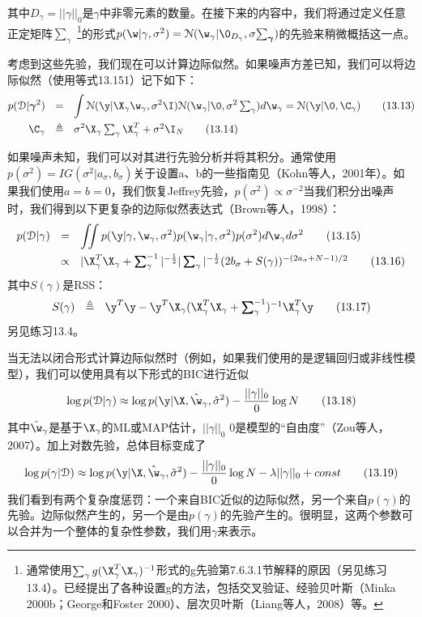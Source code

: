 \documentclass[a4paper]{article}
\begin{document}
其中$D_\gamma=||\gamma||_0$是$\gamma$中非零元素的数量。在接下来的内容中，我们将通过定义任意正定矩阵$\textstyle{\sum\nolimits_{\gamma}}$ \footnote{通常使用$\sum\nolimits_{\gamma} g (\X_{\gamma}^T \X_{\gamma})^{-1}$形式的g先验第7.6.3.1节解释的原因（另见练习13.4）。已经提出了各种设置g的方法，包括交叉验证、经验贝叶斯（Minka 2000b；George和Foster 2000）、层次贝叶斯（Liang等人，2008）等。 }的形式$p(\w|\gamma,\sigma^2)=\mathcal{N}(\w_\gamma |\0_{D_\gamma},\sigma\boldsymbol{\textstyle{\sum\nolimits_{\gamma}}})$的先验来稍微概括这一点。

考虑到这些先验，我们现在可以计算边际似然。如果噪声方差已知，我们可以将边际似然（使用等式13.151）记下如下： 
\begin{align}
p(\mathcal{D}|\boldsymbol{\gamma}^2)\ \ &=\ \ \int \mathcal{N}(\y | \X_{\gamma} \w_{\gamma},\sigma^2\I)\mathcal{N}(\w_\gamma|\0,\sigma^2\textstyle\sum\nolimits_{\gamma})d\w_\gamma =\mathcal{N}(\y|\0,\C_\gamma)\tag{13.13}\\
\C_\gamma\ \ &\triangleq \ \ \sigma^2 \X_{\gamma}\textstyle\sum\nolimits_{\gamma}\X_{\gamma}^T+\sigma^2\I_N\tag{13.14}
\end{align}

如果噪声未知，我们可以对其进行先验分析并将其积分。通常使用$p(\sigma^2)=IG(\sigma^2|a_{\sigma},b_{\sigma})$关于设置a、b的一些指南见（Kohn等人，2001年）。如果我们使用$a=b=0$，我们恢复Jeffrey先验，$p(\sigma^2)\propto \sigma^{-2}$当我们积分出噪声时，我们得到以下更复杂的边际似然表达式（Brown等人，1998）： 
\begin{align}
	p(\mathcal{D}|\gamma)\ \ &=\ \ \iint p(\y|\gamma,\w_\gamma ,\sigma^2)p(\w_\gamma|\gamma ,\sigma^2)p(\sigma^2)d\w_\gamma d\sigma^2\tag{13.15}\\
	&\propto\ \ |\X_\gamma^T\X_\gamma +\boldsymbol{\textstyle\sum}\nolimits_{\gamma}^{-1}|^{-\frac{1}{2}}|\boldsymbol{\textstyle\sum}\nolimits_{\gamma}|^{-\frac{1}{2}}(2b_\sigma+S(\gamma))^{-(2a_\sigma+N-1)/2}\tag{13.16}
\end{align}
其中$S(\gamma)$是RSS：
\begin{equation}
	S(\gamma)\ \ \triangleq\ \ \y^T\y-\y^T\X_\gamma(\X_\gamma^T\X_\gamma+\boldsymbol{\textstyle\sum}\nolimits_{\gamma}^{-1})^{-1}\X_\gamma^T\y\tag{13.17}
\end{equation} 
另见练习13.4。 

当无法以闭合形式计算边际似然时（例如，如果我们使用的是逻辑回归或非线性模型），我们可以使用具有以下形式的BIC进行近似 
\begin{equation}
	\log p(\mathcal{D}|\gamma)\approx \log p(\y|\X,\hat{\w}_\gamma,\hat{\sigma}^2)-\frac{||\gamma||_0}{0}\log N\tag{13.18}
\end{equation}
其中$\hat{\w}_\gamma$是基于$\X_\gamma$的ML或MAP估计，$||\gamma||_0$ 0是模型的“自由度”（Zou等人，2007）。加上对数先验，总体目标变成了
\begin{equation}
	\log p(\gamma|\mathcal{D})\approx \log p(\y|\X,\hat{\w}_\gamma,\hat{\sigma}^2)-\frac{||\gamma||_0}{0}\log N-\lambda||\gamma||_0+const\tag{13.19}
\end{equation}
我们看到有两个复杂度惩罚：一个来自BIC近似的边际似然，另一个来自$p(\gamma)$的先验。边际似然产生的，另一个是由$p(\gamma)$的先验产生的。很明显，这两个参数可以合并为一个整体的复杂性参数，我们用$\gamma$来表示。
\end{document}
